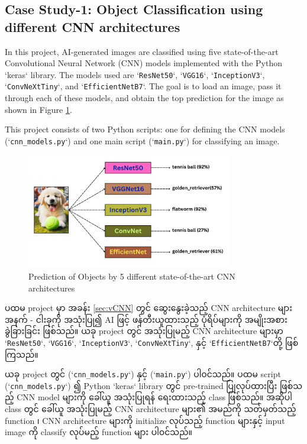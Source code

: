 \subsection{Case Study-1: Object Classification using different CNN architectures}

In this project, AI-generated images are classified using five  state-of-the-art Convolutional Neural Network (CNN) models implemented with the Python `keras` library. The models used are `\texttt{ResNet50}`, `\texttt{VGG16}`, `\texttt{InceptionV3}`, `\texttt{ConvNeXtTiny}`, and `\texttt{EfficientNetB7}`. The goal is to load an image, pass it through each of these models, and obtain the top prediction for the image as shown in Figure \ref{fig:p1R}. 

This project consists of two Python scripts: one for defining the CNN models (`\texttt{cnn\_models.py}`) and one main script (`\texttt{main.py}`) for classifying an image.

\vspace{0.5em}
\begin{figure}[h]%
\centering 
\includegraphics[width=0.8\textwidth]{imgs/p1_result.png}
\caption{Prediction of Objects by 5 different state-of-the-art CNN architectures}\label{fig:p1R}
\end{figure}

ပထမ project မှာ အခန်း \ref{sec:vCNN} တွင် ဆွေးနွေးခဲ့သည့် CNN architecture များအနက် - ငါးခုကို အသုံးပြု၍ AI ဖြင့် ဖန်တီးယူထားသည့် ပုံရိပ်များကို အမျိုးအစား ခွဲခြားခြင်း ဖြစ်သည်။ ယခု project တွင် အသုံးပြုမည့်  CNN architecture များမှာ  `\texttt{ResNet50}`, `\texttt{VGG16}`, `\texttt{InceptionV3}`, `\texttt{ConvNeXtTiny}`, နှင့် `\texttt{EfficientNetB7}`တို့ ဖြစ်ကြသည်။ 

ယခု  project တွင် (`\texttt{cnn\_models.py}`) နှင့် (`\texttt{main.py}`) ပါ၀င်သည်။ ပထမ  script  (`\texttt{cnn\_models.py}`) ၍ Python `keras` library တွင် pre-trained ပြုလုပ်ထားပြီး ဖြစ်သည့် CNN model များကို ခေါ်ယူ အသုံးပြုရန် ရေးထားသည့် class ဖြစ်သည်။ အဆိုပါ class တွင် ခေါ်ယူ အသုံးပြုမည့် CNN architecture များ၏ အမည်ကို သတ်မှတ်သည့် function ၊ CNN architecture များကို initialize လုပ်သည့် function များနှင့် input image ကို classify လုပ်မည့် function များ ပါ၀င်သည်။ 


